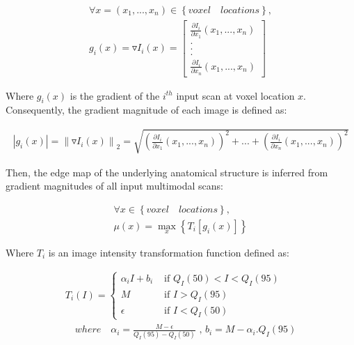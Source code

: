 \begin{equation}
\label{eq:gradient}
\begin{gathered}
\forall x=(x_{1}, ..., x_{n})\in \left\{voxel \quad locations\right\}, \\
g_{i}(x) = \triangledown I_{i}(x) = \begin{bmatrix}
\frac{\partial I_{i}}{\partial x_{1}}(x_{1}, ..., x_{n}) \\ 
.\\ 
.\\ 
.\\ 
\frac{\partial I_{i}}{\partial x_{n}}(x_{1}, ..., x_{n})
\end{bmatrix}
\end{gathered}
\end{equation}

Where $g_{i}(x)$ is the gradient of the $i^{th}$ input scan at voxel location $x$.
Consequently, the gradient magnitude of each image is defined as:

\begin{equation}
\label{eq:gradientMagnitude}
\begin{gathered}
\left | g_{i}(x) \right | = \left \| \triangledown I_{i}(x) \right \|_{2} = \sqrt{ (\frac{\partial I_{i}}{\partial x_{1}}(x_{1}, ..., x_{n}))^{2} + ... + (\frac{\partial I_{i}}{\partial x_{n}}(x_{1}, ..., x_{n}))^{2} }
\end{gathered}
\end{equation}

Then, the edge map of the underlying anatomical structure is inferred from gradient magnitudes of all input multimodal scans:

\begin{equation}
\label{eq:edgemap}
\begin{gathered}
\forall x\in \left\{voxel \quad locations\right\}, \\
\mu (x) = 
\max_{x}
\left \{ T_{i}\left [ g_{i}(x) \right ] \right \}
\end{gathered}
\end{equation}

Where $T_{i}$ is an image intensity transformation function defined as:

\begin{equation}
\label{eq:intensityTransformFunc}
\begin{gathered}
T_{i}(I) = \begin{cases}
\alpha_{i} I + b_{i} & \text{ if   } Q_I(50) < I < Q_I(95) \\ 
M & \text{ if } I > Q_I(95) \\ 
\epsilon  & \text{ if } I < Q_I(50) 
\end{cases} \\
\quad where \quad \alpha_{i} = \frac{M-\epsilon }{Q_{I}(95)-Q_{I}(50)} 
\text{  ,  } b_{i} = M - \alpha_{i} . Q_{I}(95)
\end{gathered}
\end{equation}

